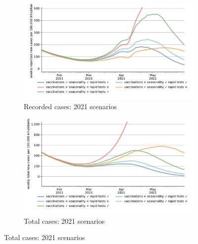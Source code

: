\begin{figure}[!tp]
    \centering
    
    \begin{subfigure}[b]{0.475\textwidth}
        \centering
        \includegraphics[width=\textwidth]{../figures/results/figures/scenario_comparisons/one_off_and_combined/full_new_known_case_cropped}
        \caption{{\small Recorded cases: 2021 scenarios}}
        \label{fig:2021_scenarios_recorded}
    \end{subfigure}
    \hfill
    \begin{subfigure}[b]{0.475\textwidth}
        \centering
        \includegraphics[width=\textwidth]{../figures/results/figures/scenario_comparisons/one_off_and_combined/full_newly_infected_cropped}
        \caption{{\small Total cases: 2021 scenarios}}
        \label{fig:2021_scenarios_newly_infected}
    \end{subfigure}
    

\end{figure}
